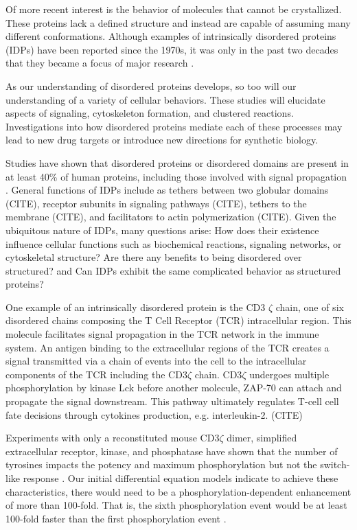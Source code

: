 \documentclass[../AdvancementSummary.tex]{subfiles}
\begin{document}
Of more recent interest is the behavior of molecules that cannot be crystallized. These proteins lack a defined structure and instead are capable of assuming many different conformations. Although examples of intrinsically disordered proteins (IDPs) have been reported since the 1970s, it was only in the past two decades that they became a focus of major research \cite{Dunker2008}. 

As our understanding of disordered proteins develops, so too will our understanding of a variety of cellular behaviors. These studies will elucidate aspects of signaling, cytoskeleton formation, and clustered reactions. Investigations into how disordered proteins mediate each of these processes may lead to new drug targets or introduce new directions for synthetic biology.

Studies have shown that disordered proteins or disordered domains are present in at least 40\% of human proteins, including those involved with signal propagation \cite{Tompa2012}. General functions of IDPs include as tethers between two globular domains (CITE), receptor subunits in signaling pathways (CITE), tethers to the membrane (CITE), and facilitators to actin polymerization (CITE). Given the ubiquitous nature of IDPs, many questions arise: How does their existence influence cellular functions such as biochemical reactions, signaling networks, or cytoskeletal structure?  Are there any benefits to being disordered over structured? and Can IDPs exhibit the same complicated behavior as structured proteins?

One example of an intrinsically disordered protein is the CD3 $\zeta$ chain, one of six disordered chains composing the T Cell Receptor (TCR) intracellular region. This molecule facilitates signal propagation in the TCR network in the immune system. An antigen binding to the extracellular regions of the TCR creates a signal transmitted via a chain of events into the cell to the intracellular components of the TCR including the CD3$\zeta$ chain. CD3$\zeta$ undergoes multiple phosphorylation by kinase Lck before another molecule, ZAP-70 can attach and propagate the signal downstream. This pathway ultimately regulates T-cell cell fate decisions through cytokines production, e.g. interleukin-2. (CITE)


Experiments with only a reconstituted mouse CD3$\zeta$ dimer, simplified extracellular receptor, kinase, and phosphatase have shown that the number of tyrosines impacts the potency and maximum phosphorylation but not the switch-like response \cite{Mukhopadhyay2016}. Our initial differential equation models indicate to achieve these characteristics, there would need to be a phosphorylation-dependent enhancement of more than 100-fold. That is, the sixth phosphorylation event would be at least 100-fold faster than the first phosphorylation event \cite{Mukhopadhyay2016}. 
\end{document}
